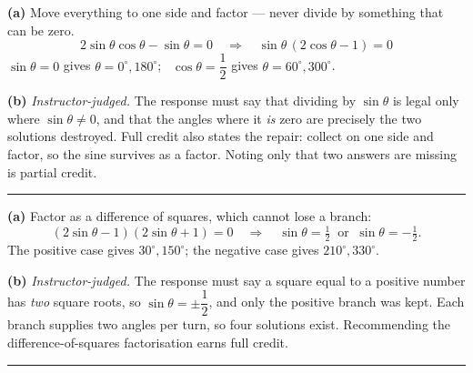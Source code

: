 \documentclass[12pt]{article}
\begin{document}



\textbf{(a)} Move everything to one side and factor --- never divide by something that can be zero.
\[ 2\sin\theta\cos\theta - \sin\theta = 0 \quad\Longrightarrow\quad \sin\theta\,(2\cos\theta - 1) = 0 \]
$\sin\theta = 0$ gives $\theta = 0^\circ, 180^\circ$; \ $\cos\theta = \dfrac{1}{2}$ gives $\theta = 60^\circ, 300^\circ$. 

\textbf{(b)} \emph{Instructor-judged.} The response must say that dividing by $\sin\theta$ is legal only where $\sin\theta \ne 0$, and that the angles where it \emph{is} zero are precisely the two solutions destroyed. Full credit also states the repair: collect on one side and factor, so the sine survives as a factor. Noting only that two answers are missing is partial credit.

\vspace{0.12cm}\noindent\rule{\linewidth}{0.2pt}\vspace{0.12cm}


\textbf{(a)} Factor as a difference of squares, which cannot lose a branch:
\[ (2\sin\theta - 1)(2\sin\theta + 1) = 0 \quad\Longrightarrow\quad \sin\theta = \tfrac{1}{2} \ \text{ or } \ \sin\theta = -\tfrac{1}{2}. \]
The positive case gives $30^\circ, 150^\circ$; the negative case gives $210^\circ, 330^\circ$. 

\textbf{(b)} \emph{Instructor-judged.} The response must say a square equal to a positive number has \emph{two} square roots, so $\sin\theta = \pm\dfrac{1}{2}$, and only the positive branch was kept. Each branch supplies two angles per turn, so four solutions exist. Recommending the difference-of-squares factorisation earns full credit.

\vspace{0.12cm}\noindent\rule{\linewidth}{0.2pt}\vspace{0.12cm}

\end{document}
